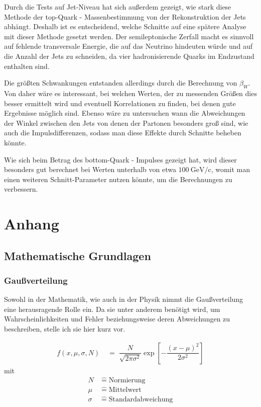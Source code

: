 \documentclass[
a4paper,                                %
twoside,                                %
BCOR1.4cm,                      %
ngerman,                                %
10pt,                           %
headings=normal,                %
headsepline,                    %
clearplainpage, %
final,                                  %
div=14,
parskip=full
]{scrbook}
\begin{document}
Durch die Tests auf Jet-Niveau hat sich au\ss erdem gezeigt, wie stark diese Methode der top-Quark - Massenbestimmung von der Rekonstruktion der Jets abh\"angt. Deshalb ist es entscheidend, welche Schnitte auf eine sp\"atere Analyse mit dieser Methode gesetzt werden. Der semileptonische Zerfall macht es sinnvoll auf fehlende transversale Energie, die auf das Neutrino hindeuten w\"urde und auf die Anzahl der Jets zu schneiden, da vier hadronisierende Quarks im Endzustand enthalten sind. 

Die gr\"o\ss ten Schwankungen entstanden allerdings durch die Berechnung von $ \beta_{W} $. Von daher w\"are es interessant, bei welchen Werten, der zu messenden Gr\"o\ss en dies besser ermittelt wird und eventuell Korrelationen zu finden, bei denen gute Ergebnisse m\"oglich sind. Ebenso w\"are zu untersuchen wann die Abweichungen der Winkel zwischen den Jets von denen der Partonen besonders gro\ss\; sind, wie auch die Impulsdifferenzen, sodass man diese Effekte durch Schnitte beheben k\"onnte.

Wie sich beim Betrag des bottom-Quark - Impulses gezeigt hat, wird dieser besonders gut berechnet bei Werten unterhalb von etwa $ 100\ \text{GeV}\text{/c} $, womit man einen weiteren Schnitt-Parameter nutzen k\"onnte, um die Berechnungen zu verbessern.

\newpage

\chapter{Anhang}

\section{Mathematische Grundlagen}

\subsection{Gau\ss verteilung}

Sowohl in der Mathematik, wie auch in der Physik nimmt die Gau\ss verteilung eine herausragende Rolle ein. Da sie unter anderem ben\"otigt wird, um Wahrscheinlichkeiten und Fehler beziehungsweise deren Abweichungen zu beschreiben, stelle ich sie hier kurz vor.

\begin{align}
	f(x, \mu , \sigma ,N)
\;&=\;
	\dfrac{N}{\sqrt{2 \pi \sigma^{2}}}
	\exp\left[-\dfrac{\left(x - \mu\right)^{2}}
	{2 \sigma^{2}}\right]
\end{align}
mit
\begin{align*}
	N\;&\mathrel{\hat=}\;\text{Normierung}
\\
	\mu\;&\mathrel{\hat=}\;\text{Mittelwert}
\\
	\sigma\;&\mathrel{\hat=}\;\text{Standardabweichung}
\end{align*}
\end{document}

